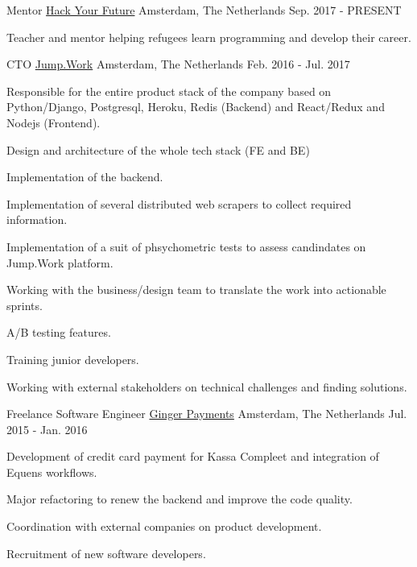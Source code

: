 \begin{cventries}
  \cventry
    {Mentor} %
    {\href{https://www.hackyourfuture.net}{Hack Your Future}} %
    {Amsterdam, The Netherlands} %
    {Sep. 2017 - PRESENT} %
    {
      \begin{cvitems} %
      \item {Teacher and mentor helping refugees learn programming and develop their career.}
      \end{cvitems}
    }

  \cventry
    {CTO} %
    {\href{https://www.jump.work/}{Jump.Work}} %
    {Amsterdam, The Netherlands} %
    {Feb. 2016 - Jul. 2017} %
    {
      \begin{cvitems} %
        \item {Responsible for the entire product stack of the company based on Python/Django, Postgresql, Heroku, Redis (Backend) and React/Redux and Nodejs (Frontend).}
        \item {Design and architecture of the whole tech stack (FE and BE)}
        \item {Implementation of the backend.}
        \item {Implementation of several distributed web scrapers to collect required information.}
        \item {Implementation of a suit of phsychometric tests to assess candindates on Jump.Work platform.}
        \item {Working with the business/design team to translate the work into actionable sprints.}
        \item {A/B testing features.}
        \item {Training junior developers.}
        \item {Working with external stakeholders on technical challenges and finding solutions.}
      \end{cvitems}
    }

  \cventry
    {Freelance Software Engineer} %
    {\href{https://www.gingerpayments.com}{Ginger Payments}} %
    {Amsterdam, The Netherlands} %
    {Jul. 2015 - Jan. 2016} %
    {
      \begin{cvitems} %
      \item {Development of credit card payment for Kassa Compleet and integration of Equens workflows.}
      \item {Major refactoring to renew the backend and improve the code quality.}
      \item {Coordination with external companies on product development.}
      \item {Recruitment of new software developers.}
      \end{cvitems}
    }



\end{cventries}
